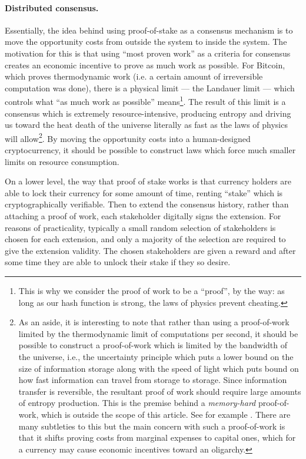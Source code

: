 \documentclass[letterpaper]{article}
\begin{document}
\paragraph{Distributed consensus.}
Essentially, the idea behind using proof-of-stake as a consensus mechanism is to
move the opportunity costs from outside the system to inside the system. The
motivation for this is that using ``most proven work'' as a criteria for consensus
creates an economic incentive to prove as much work as possible. For Bitcoin, which
proves thermodynamic work (i.e. a certain amount of irreversible computation was
done), there is a physical limit --- the Landauer limit --- which controls what
``as much work as possible'' means\footnote{This is why we consider the proof of work to
be a ``proof'', by the way: as long as our hash function is strong, the laws of
physics prevent cheating.}. The result
of this limit is a consensus which is
extremely resource-intensive, producing entropy and driving us toward the heat death
of the universe literally as fast as the laws of physics will allow\footnote{As an
aside, it is interesting
to note that rather than using a proof-of-work limited
by the thermodynamic limit of computations per second, it should be possible to
construct a proof-of-work which is limited by the bandwidth of the universe, i.e.,
the uncertainty principle which puts a lower bound on the size of information storage
along with the speed of light which puts bound on how fast information can travel from
storage to storage. Since information transfer is reversible, the resultant proof of
work should require large amounts of entropy production. This is the premise behind a
\emph{memory-hard} proof-of-work, which is outside the scope of this article. See
for example \cite{tromp}. There are many subtleties to this but the main
concern with such a proof-of-work is that it shifts proving costs from marginal
expenses to capital ones, which for a currency may cause economic incentives toward
an oligarchy.}.
By moving the opportunity costs into a human-designed cryptocurrency, it should be
possible to construct laws which force much smaller limits on resource consumption.

On a lower level, the way that proof of stake works is that currency holders are able
to lock their currency for some amount of time, renting ``stake'' which is cryptographically
verifiable. Then to extend the consensus history, rather than attaching a proof of work,
each stakeholder digitally signs the extension. For reasons of practicality, typically
a small random selection of stakeholders is chosen for each extension, and only a majority
of the selection are required to give the extension validity. The chosen stakeholders are
given a reward and after some time they are able to unlock their stake if they so desire.
\end{document}
